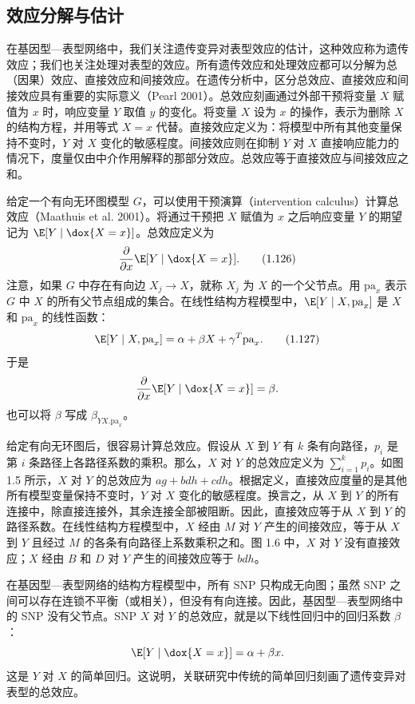 \subsection{效应分解与估计}

在基因型—表型网络中，我们关注遗传变异对表型效应的估计，这种效应称为遗传效应；我们也关注处理对表型的效应。所有遗传效应和处理效应都可以分解为总（因果）效应、直接效应和间接效应。在遗传分析中，区分总效应、直接效应和间接效应具有重要的实际意义（Pearl 2001）。总效应刻画通过外部干预将变量 $X$ 赋值为 $x$ 时，响应变量 $Y$ 取值 $y$ 的变化。将变量 $X$ 设为 $x$ 的操作，表示为删除 $X$ 的结构方程，并用等式 $X=x$ 代替。直接效应定义为：将模型中所有其他变量保持不变时，$Y$ 对 $X$ 变化的敏感程度。间接效应则在抑制 $Y$ 对 $X$ 直接响应能力的情况下，度量仅由中介作用解释的那部分效应。总效应等于直接效应与间接效应之和。

给定一个有向无环图模型 $G$，可以使用干预演算（intervention calculus）计算总效应（Maathuis et al. 2001）。将通过干预把 $X$ 赋值为 $x$ 之后响应变量 $Y$ 的期望记为 $\E[Y\mid\dox{X=x}]$。总效应定义为
\begin{equation}
\frac{\partial}{\partial x}\E[Y\mid\dox{X=x}].
\tag{1.126}
\end{equation}
注意，如果 $G$ 中存在有向边 $X_j\to X$，就称 $X_j$ 为 $X$ 的一个父节点。用 $\mathrm{pa}_x$ 表示 $G$ 中 $X$ 的所有父节点组成的集合。在线性结构方程模型中，$\E[Y\mid X,\mathrm{pa}_x]$ 是 $X$ 和 $\mathrm{pa}_x$ 的线性函数：
\begin{equation}
\E[Y\mid X,\mathrm{pa}_x]
=\alpha+\beta X+\gamma^T\mathrm{pa}_x.
\tag{1.127}
\end{equation}
于是
\[
\frac{\partial}{\partial x}\E[Y\mid\dox{X=x}]=\beta.
\]
也可以将 $\beta$ 写成 $\beta_{YX.\mathrm{pa}_x}$。

给定有向无环图后，很容易计算总效应。假设从 $X$ 到 $Y$ 有 $k$ 条有向路径，$p_i$ 是第 $i$ 条路径上各路径系数的乘积。那么，$X$ 对 $Y$ 的总效应定义为 $\sum_{i=1}^kp_i$。如图 1.5 所示，$X$ 对 $Y$ 的总效应为 $ag+bdh+cdh$。根据定义，直接效应度量的是其他所有模型变量保持不变时，$Y$ 对 $X$ 变化的敏感程度。换言之，从 $X$ 到 $Y$ 的所有连接中，除直接连接外，其余连接全部被阻断。因此，直接效应等于从 $X$ 到 $Y$ 的路径系数。在线性结构方程模型中，$X$ 经由 $M$ 对 $Y$ 产生的间接效应，等于从 $X$ 到 $Y$ 且经过 $M$ 的各条有向路径上系数乘积之和。图 1.6 中，$X$ 对 $Y$ 没有直接效应；$X$ 经由 $B$ 和 $D$ 对 $Y$ 产生的间接效应等于 $bdh$。




在基因型—表型网络的结构方程模型中，所有 SNP 只构成无向图；虽然 SNP 之间可以存在连锁不平衡（或相关），但没有有向连接。因此，基因型—表型网络中的 SNP 没有父节点。SNP $X$ 对 $Y$ 的总效应，就是以下线性回归中的回归系数 $\beta$：
\[
\E[Y\mid\dox{X=x}]=\alpha+\beta x.
\]
这是 $Y$ 对 $X$ 的简单回归。这说明，关联研究中传统的简单回归刻画了遗传变异对表型的总效应。

